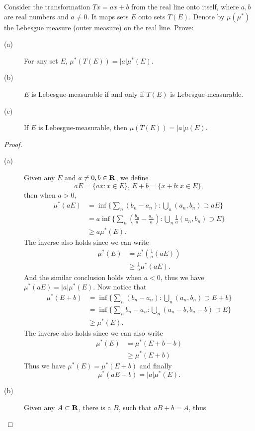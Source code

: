 \begin{pro}%
	Consider the transformation $Tx=ax+b$ from the real line onto itself, where $a,b$ are real numbers and $a\neq 0$. It maps sets $E$ onto sets $T(E)$. Denote by $\mu(\mu^*)$ the Lebesgue measure (outer measure) on the real line. Prove:
	\begin{description}
		\item[(a)] For any set $E$, $\mu^*(T(E))=|a|\mu^*(E)$.
		\item[(b)] $E$ is Lebesgue-measurable if and only if $T(E)$ is Lebesgue-measurable.
		\item[(c)] If $E$ is Lebesgue-measurable, then $\mu(T(E))=|a|\mu(E)$.
	\end{description}
\end{pro}
\begin{proof}
	\begin{description}
		\item[(a)] Given any $E$ and $a\neq 0,b\in\mathbf{R}$, we define
			\[aE=\{ax\colon x\in E\},\,E+b=\{x+b\colon x\in E\},\] then when $a>0$,
			\begin{align*}
				\mu^*(aE)&=\inf\{\sum_n (b_n-a_n)\colon \bigcup_n (a_n,b_n)\supset aE\}\\
				&=a\inf\{\sum_n(\frac{b_n}{a}-\frac{a_n}{a})\colon \bigcup_n \frac{1}{a}(a_n,b_n)\supset E\}\\
				&\geq a\mu^*(E).
			\end{align*}
			The inverse also holds since we can write
			\begin{align*}
				\mu^*(E)&=\mu^*(\frac{1}{a}(aE))\\
				&\geq \frac{1}{a}\mu^*(aE).
			\end{align*}
			And the similar conclusion holds when $a<0$, thus we have $\mu^*(aE)=|a|\mu^*(E)$. Now notice that
			\begin{align*}
				\mu^*(E+b)&=\inf\{\sum_{n}(b_n-a_n)\colon \bigcup_n (a_n,b_n)\supset E+b\}\\
				&=\inf\{\sum_n b_n-a_n\colon \bigcup_n(a_n-b,b_n-b)\supset E\}\\
				&\geq\mu^*(E).
			\end{align*}
			The inverse also holds since we can also write
			\begin{align*}
				\mu^*(E)&=\mu^*(E+b-b)\\
						&\geq\mu^*(E+b)
			\end{align*}
			Thus we have $\mu^*(E)=\mu^*(E+b)$ and finally
			\[\mu^*(aE+b)=|a|\mu^*(E).\]
	\item[(b)] 	Given any $A\subset\mathbf{R}$, there is a $B$, such that $aB+b=A$, thus

\end{description}
\end{proof}
